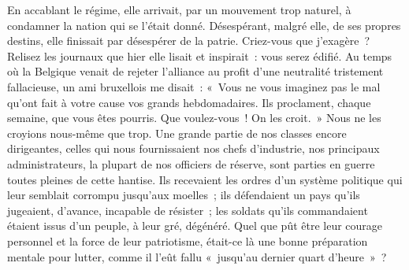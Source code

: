 \documentclass[french,twoside]{book} %
\begin{document}
En accablant le régime, elle arrivait, par un mouvement trop naturel, à condamner la nation qui se l’était donné. Désespérant, malgré elle, de ses propres destins, elle finissait par désespérer de la patrie. Criez-vous que j’exagère ? Relisez les journaux que hier elle lisait et inspirait : vous serez édifié. Au temps où la Belgique venait de rejeter l’alliance au profit d’une neutralité tristement fallacieuse, un ami bruxellois me disait : « Vous ne vous imaginez pas le mal qu’ont fait à votre cause vos grands hebdomadaires. Ils proclament, chaque semaine, que vous êtes pourris. Que voulez-vous ! On les croit. » Nous ne les croyions nous-même que trop. Une grande partie de nos classes encore dirigeantes, celles qui nous fournissaient nos chefs d’industrie, nos principaux administrateurs, la plupart de nos officiers de réserve, sont parties en guerre toutes pleines de cette hantise. Ils recevaient les ordres d’un système politique qui leur semblait corrompu jusqu’aux moelles ; ils défendaient un pays qu’ils jugeaient, d’avance, incapable de résister ; les soldats qu’ils commandaient étaient issus d’un peuple, à leur gré, dégénéré. Quel que pût être leur courage personnel et la force de leur patriotisme, était-ce là une bonne préparation mentale pour lutter, comme il l’eût fallu « jusqu’au dernier quart d’heure » ?\par
\end{document}
